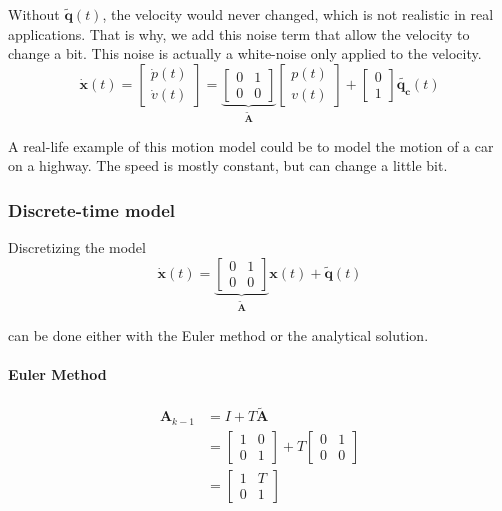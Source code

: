 Without $\mathbf{\tilde{q}}(t)$, the velocity would never changed, which is not realistic in real applications. That is why, we add this noise term that allow the velocity to change a bit. This noise is actually a white-noise only applied to the velocity.
\begin{equation}
    \mathbf{\dot{x}}(t) = 
    \left[ \begin{array}{c}
        \dot{p}(t) \\
        \dot{v}(t)
    \end{array}\right] = \underbrace{\left[\begin{array}{cc}
        0 & 1 \\
        0 & 0
    \end{array}\right]}_{\mathbf{\tilde{A}}} \left[\begin{array}{c}
        p(t) \\
        v(t)
    \end{array}\right] + \left[\begin{array}{c}
        0 \\
        1
    \end{array}\right]\mathbf{\tilde{q_c}}(t)
\end{equation}


A real-life example of this motion model could be to model the motion of a car on a highway. The speed is mostly constant, but can change a little bit.

\subsubsection{Discrete-time model}
Discretizing the model
\begin{equation}
\mathbf{\dot{x}}(t) = \underbrace{\left[\begin{array}{cc}
    0 & 1 \\
    0 & 0
\end{array}\right]}_{\mathbf{\tilde{A}}} \mathbf{x}(t) + \mathbf{\tilde{q}}(t)
\end{equation}

can be done either with the Euler method or the analytical solution.
\paragraph{Euler Method}
\begin{align}
    \mathbf{A}_{k-1} & = I + T \mathbf{\tilde{A}} \\
              &= \left[\begin{array}{cc}
                  1 & 0 \\
                  0 & 1
              \end{array}\right] + T \left[\begin{array}{cc}
                  0 & 1 \\
                  0 & 0
              \end{array}\right] \\
              &= \left[\begin{array}{cc}
                  1 & T \\
                  0 & 1
              \end{array}\right]
\end{align}

